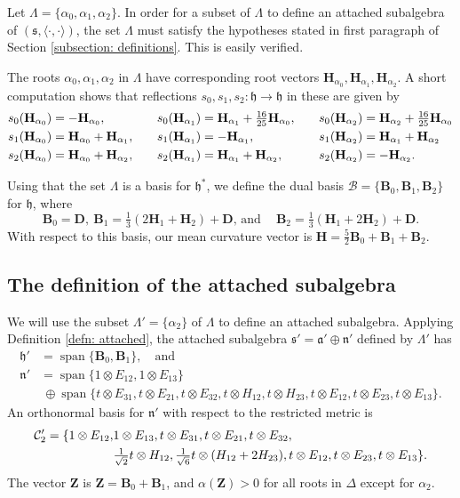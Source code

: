 \documentclass[12pt]{amsart}
\newcommand{\smallfrac}[2]{\textstyle{\frac{#1}{#2}}  }
\newcommand{\bfZ}{\ensuremath{\mathbf Z} }
\newcommand{\bfB}{\ensuremath{\mathbf B} }
\newcommand{\bfD}{\ensuremath{\mathbf D} }
\newcommand{\bfH}{\ensuremath{\mathbf H} }
\newcommand{\calB}{\ensuremath{\mathcal{B}} }
\newcommand{\calC}{\ensuremath{\mathcal{C}} }
\newcommand{\myspan}{\operatorname{span}}
\newcommand{\frakh}{\ensuremath{\mathfrak{h}} }
\newcommand{\frakn}{\ensuremath{\mathfrak{n}} }
\newcommand{\fraks}{\ensuremath{\mathfrak{s}} }
\renewcommand\a{{\mathfrak{a}}}
\newcommand\n{{\mathfrak{n}}}
\newcommand\s{{\mathfrak{s}}}
\newcommand\ip{{\langle\cdot {,} \cdot\rangle}}
\theoremstyle{plain}
\theoremstyle{definition}
\theoremstyle{remark}
\numberwithin{equation}{section}
\numberwithin{theorem}{section}
\begin{document}
Let  $\Lambda = \{\alpha_0, \alpha_1, \alpha_2\}$. 
 In order for a subset of $\Lambda$ to define an attached subalgebra of $(\fraks,\ip)$, the set $\Lambda$  must satisfy the 
hypotheses stated in first paragraph of Section \ref{subsection: definitions}.  This is easily verified.

The roots $\alpha_0, \alpha_1, \alpha_2$ in $\Lambda$ have corresponding root vectors $\bfH_{\alpha_0}, \bfH_{\alpha_1}, \bfH_{\alpha_2}$.
A short computation shows that reflections $s_0, s_1, s_2 : \frakh \to \frakh$ in these  are given by  
\begin{align} s_0(\bfH_{\alpha_0})&=-\bfH_{\alpha_0}, \quad &s_0(\bfH_{\alpha_1}) &=\bfH_{\alpha_1} +\tfrac{16}{25}\bfH_{\alpha_0}, \quad &s_0(\bfH_{\alpha_2}) &= \bfH_{\alpha_2} +\tfrac{16}{25}\bfH_{\alpha_0} \notag \\
s_1(\bfH_{\alpha_0})&=\bfH_{\alpha_0} + \bfH_{\alpha_1}, \quad &s_1(\bfH_{\alpha_1}) &=-\bfH_{\alpha_1}, \quad &s_1(\bfH_{\alpha_2}) &= \bfH_{\alpha_1} +\bfH_{\alpha_2} \notag \\
s_2(\bfH_{\alpha_0})&= \bfH_{\alpha_0} +\bfH_{\alpha_2}, \quad &s_2(\bfH_{\alpha_1}) &=\bfH_{\alpha_1} +\bfH_{\alpha_2}, \quad &s_2(\bfH_{\alpha_2}) &= -\bfH_{\alpha_2}. \notag 
\end{align}

Using that the set $\Lambda$ is a basis for $\frakh^*$, we define the  dual basis  $\calB = \{\bfB_0, \bfB_1, \bfB_2\}$ for $\frakh$,  
where  
\[ \bfB_0=\bfD, ~\bfB_1=\tfrac13 (2\bfH_1 + \bfH_2)   +\bfD, \, \text{and} \quad ~\bfB_2 =\tfrac13 (\bfH_1 + 2\bfH_2)+\bfD.\]
 With respect to this basis, our mean curvature vector is 
$\bfH= \tfrac52 \bfB_0 +\bfB_1 +\bfB_2.$

  \subsection{The definition  of the attached subalgebra}
We will use the subset 
  $\Lambda' = \{\alpha_2\}$ of $\Lambda$ to define an attached subalgebra. 
  Applying Definition \ref{defn: attached}, the attached subalgebra $\s'=\a' \oplus \n'$ defined by $\Lambda'$ has 
\begin{align*}\frakh' &= \myspan\{\bfB_0, \bfB_1\}, \quad \text{and} \\
  \n' &=  \myspan\{1\otimes E_{12}, 1\otimes E_{13}\} \\
                  &~\oplus \myspan\{t\otimes E_{31}, t\otimes E_{21}, t\otimes E_{32}, t\otimes H_{12}, t\otimes H_{23}, t\otimes E_{12}, t\otimes E_{23}, t\otimes E_{13}\}.\end{align*}
             An orthonormal basis for $\frakn'$ with respect to the restricted metric is 
\begin{align}
\label{ordered-basis-n-prime}
\calC_2' = \{1\otimes E_{12},  &1\otimes E_{13}, 
t\otimes E_{31}, t\otimes E_{21}, t\otimes E_{32}, \\
&\smallfrac{1}{\sqrt 2}t\otimes H_{12},\smallfrac{1}{\sqrt 6}t\otimes(H_{12}+2 H_{23}), t\otimes E_{12}, t\otimes E_{23}, t\otimes E_{13}\}. \notag
\end{align}
The vector $\bfZ$ is $\bfZ= \bfB_{0} + \bfB_{1}$, and $\alpha(\bfZ)>0$ for all roots in $\Delta$ except for $\alpha_2.$
\end{document}
